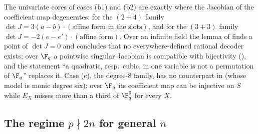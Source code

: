 \begin{remark}
The univariate cores of cases (b1) and (b2) are exactly where the Jacobian of the
coefficient map degenerates: for the $(2{+}4)$ family $\det J=3(a-b)\cdot(\text{affine
form in the slots})$, and for the $(3{+}3)$ family $\det J=-2(e-e')\cdot(\text{affine
form})$.  Over an infinite field the lemma of  finds a point of
$\det J=0$ and concludes that no everywhere-defined rational decoder exists; over $\F_q$
a pointwise singular Jacobian is compatible with bijectivity (),
and the statement ``a quadratic, resp.\ cubic, in one variable is not a permutation of
$\F_q$'' replaces it.  Case (c), the degree-$8$ family, has no counterpart in
 (whose model is monic degree six); over $\F_q$ its coefficient map can
be injective on $S$ while $E_X$ misses more than a third of $\F_q^6$ for every $X$.
\end{remark}

\subsection{The regime $p\nmid 2n$ for general $n$}
\label{sec:charp-regime}

